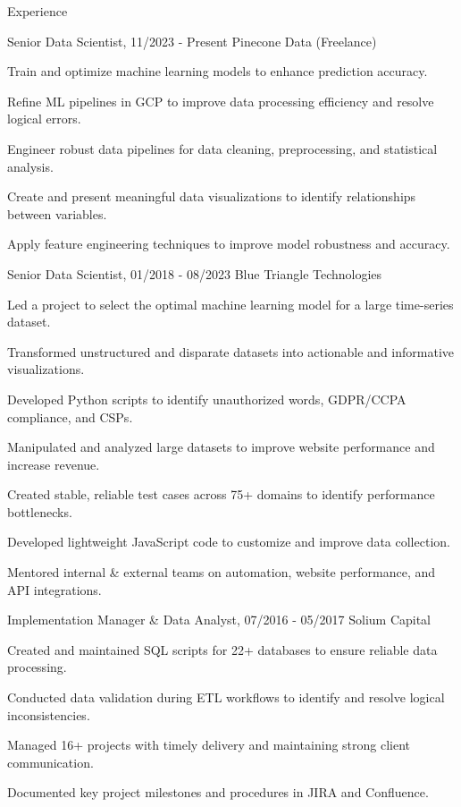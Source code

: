 \documentclass{resume} %
\begin{document}
\begin{rSection}{Experience}

\begin{rSubsection} {Senior Data Scientist,} {11/2023 - Present} {Pinecone Data (Freelance)} 
\item Train and optimize machine learning models to enhance prediction accuracy.
\item Refine ML pipelines in GCP to improve data processing efficiency and resolve logical errors.
\item Engineer robust data pipelines for data cleaning, preprocessing, and statistical analysis.
\item Create and present meaningful data visualizations to identify relationships between variables.
\item Apply feature engineering techniques to improve model robustness and accuracy.
\end{rSubsection}

\begin{rSubsection} {Senior Data Scientist,} {01/2018 - 08/2023} {Blue Triangle Technologies}
\item Led a project to select the optimal machine learning model for a large time-series dataset.
\item Transformed unstructured and disparate datasets into actionable and informative visualizations.
\item Developed Python scripts to identify unauthorized words, GDPR/CCPA compliance, and CSPs. 
\item Manipulated and analyzed large datasets to improve website performance and increase revenue. 
\item Created stable, reliable test cases across 75+ domains to identify performance bottlenecks. 
\item Developed lightweight JavaScript code to customize and improve data collection.
\item Mentored internal \& external teams on automation, website performance, and API integrations.
\end{rSubsection}

\begin{rSubsection}{Implementation Manager \& Data Analyst,}  {07/2016 - 05/2017} {Solium Capital}
\item Created and maintained SQL scripts for 22+ databases to ensure reliable data processing. 
\item Conducted data validation during ETL workflows to identify and resolve logical inconsistencies.
\item Managed 16+ projects with timely delivery and maintaining strong client communication.
\item Documented key project milestones and procedures in JIRA and Confluence.
\end{rSubsection}


\end{rSection}
\end{document}
